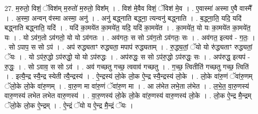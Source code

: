 \documentclass[17pt]{extarticle}
\begin{document}
27. म॒रुतो॒ विशं॒ ॅविश॑म् म॒रुतो॑ म॒रुतो॒ विश᳚म् । . विश॑ मे॒वैव विशं॒ ॅविश॑ मे॒व । . ए॒वास्मा॑ अस्मा ए॒वै वास्मै᳚ । . अ॒स्मा॒ अन्वन् व॑स्मा अस्मा॒ अनु॑ । . अनु॑ बद्ध्नाति बद्ध्ना॒ त्यन्वनु॑ बद्ध्नाति । . ब॒द्ध्ना॒ति॒ यदि॒ यदि॑ बद्ध्नाति बद्ध्नाति॒ यदि॑ । . यदि॑ का॒मये॑त का॒मये॑त॒ यदि॒ यदि॑ का॒मये॑त । . का॒मये॑त॒ यो यः का॒मये॑त का॒मये॑त॒ यः । . यो ऽव॑ग॒तो ऽव॑गतो॒ यो यो ऽव॑गतः । . अव॑गतः॒ स सो ऽव॑ग॒तो ऽव॑गतः॒ सः । . अव॑गत॒ इत्यव॑ - ग॒तः॒ । . सो ऽपाप॒ स सो ऽप॑ । . अप॑ रुद्ध्यताꣳ रुद्ध्यता॒ मपाप॑ रुद्ध्यताम् । . रु॒द्ध्य॒तां॒ ॅयो यो रु॑द्ध्यताꣳ रुद्ध्यतां॒ ॅयः । . यो ऽप॑रु॒द्धो ऽप॑रुद्धो॒ यो यो ऽप॑रुद्धः । . अप॑रुद्धः॒ स सो ऽप॑रु॒द्धो ऽप॑रुद्धः॒ सः । . अप॑रुद्ध॒ इत्यप॑ - रु॒द्धः॒ । . सो ऽवाव॒ स सो ऽव॑ । . अव॑ गच्छतु गच्छ॒ त्ववाव॑ गच्छतु । . ग॒च्छ॒ त्वितीति॑ गच्छतु गच्छ॒ त्विति॑ । . इत्यै॒न्द्र स्यै॒न्द्र स्येती त्यै॒न्द्रस्य॑ । . ऐ॒न्द्रस्य॑ लो॒के लो॒क ऐ॒न्द्र स्यै॒न्द्रस्य॑ लो॒के । . लो॒के वा॑रु॒णं ॅवा॑रु॒णम् ॅलो॒के लो॒के वा॑रु॒णम् । . वा॒रु॒ण मा वा॑रु॒णं ॅवा॑रु॒ण मा । . आ ल॑भेत लभे॒ता ल॑भेत । . ल॒भे॒त॒ वा॒रु॒णस्य॑ वारु॒णस्य॑ लभेत लभेत वारु॒णस्य॑ । . वा॒रु॒णस्य॑ लो॒के लो॒के वा॑रु॒णस्य॑ वारु॒णस्य॑ लो॒के । . लो॒क ऐ॒न्द्र मै॒न्द्रम् ॅलो॒के लो॒क ऐ॒न्द्रम् । . ऐ॒न्द्रं ॅयो य ऐ॒न्द्र मै॒न्द्रं ॅयः । \newline
\end{document}
